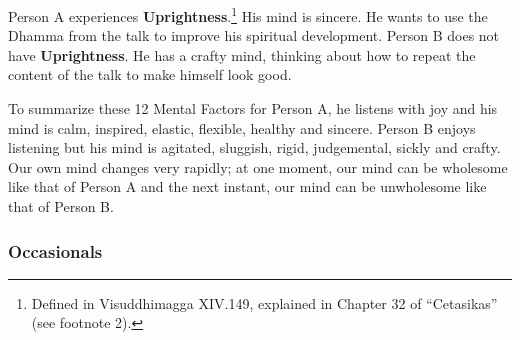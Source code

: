 Person A experiences \textbf{Uprightness}.\footnote{Defined in Visuddhimagga XIV.149, explained in Chapter 32 of “Cetasikas” (see footnote 2).} His mind is sincere. He wants to use the Dhamma from the talk to improve his spiritual development. Person B does not have \textbf{Uprightness}. He has a crafty mind, thinking about how to repeat the content of the talk to make himself look good.

To summarize these 12 Mental Factors for Person A, he listens with joy and his mind is calm, inspired, elastic, flexible, healthy and sincere. Person B enjoys listening but his mind is agitated, sluggish, rigid, judgemental, sickly and crafty. Our own mind changes very rapidly; at one moment, our mind can be wholesome like that of Person A and the next instant, our mind can be unwholesome like that of Person B.

\subsubsection*{Occasionals}


